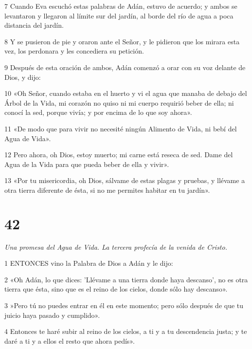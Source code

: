 \par 7 Cuando Eva escuchó estas palabras de Adán, estuvo de acuerdo; y ambos se levantaron y llegaron al límite sur del jardín, al borde del río de agua a poca distancia del jardín.

\par 8 Y se pusieron de pie y oraron ante el Señor, y le pidieron que los mirara esta vez, los perdonara y les concediera su petición.

\par 9 Después de esta oración de ambos, Adán comenzó a orar con su voz delante de Dios, y dijo:

\par 10 «Oh Señor, cuando estaba en el huerto y vi el agua que manaba de debajo del Árbol de la Vida, mi corazón no quiso ni mi cuerpo requirió beber de ella; ni conocí la sed, porque vivía; y por encima de lo que soy ahora».

\par 11 «De modo que para vivir no necesité ningún Alimento de Vida, ni bebí del Agua de Vida».

\par 12 Pero ahora, oh Dios, estoy muerto; mi carne está reseca de sed. Dame del Agua de la Vida para que pueda beber de ella y vivir».

\par 13 «Por tu misericordia, oh Dios, sálvame de estas plagas y pruebas, y llévame a otra tierra diferente de ésta, si no me permites habitar en tu jardín».

\chapter{42}

\par \textit{Una promesa del Agua de Vida. La tercera profecía de la venida de Cristo.}

\par 1 ENTONCES vino la Palabra de Dios a Adán y le dijo:

\par 2 «Oh Adán, lo que dices: 'Llévame a una tierra donde haya descanso', no es otra tierra que ésta, sino que es el reino de los cielos, donde sólo hay descanso».

\par 3 »Pero tú no puedes entrar en él en este momento; pero sólo después de que tu juicio haya pasado y cumplido».

\par 4 Entonces te haré subir al reino de los cielos, a ti y a tu descendencia justa; y te daré a ti y a ellos el resto que ahora pedís».

